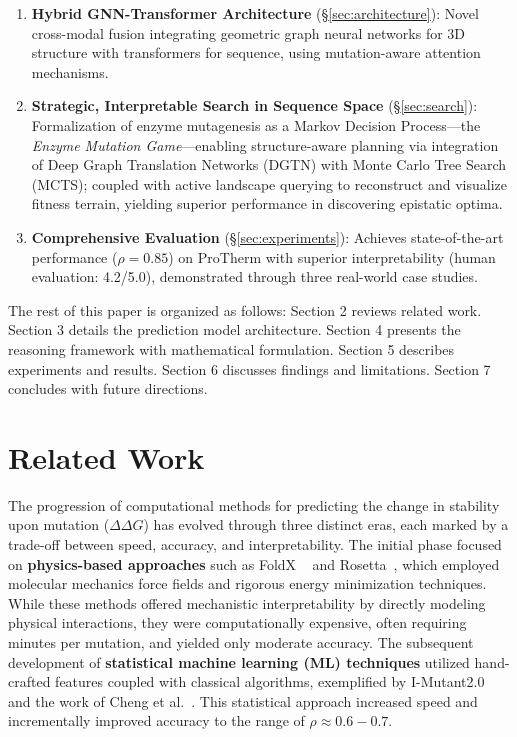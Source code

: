 \documentclass[11pt]{article}
\begin{document}
\begin{enumerate}
    \item \textbf{Hybrid GNN-Transformer Architecture}
        (\S\ref{sec:architecture}): Novel cross-modal fusion integrating
        geometric graph neural networks for 3D structure with transformers for
        sequence, using mutation-aware attention mechanisms.
    
\item \textbf{Strategic, Interpretable Search in Sequence Space}
    (\S\ref{sec:search}): Formalization of enzyme mutagenesis as a Markov
        Decision Process—the \textit{Enzyme Mutation Game}—enabling
        structure-aware planning via integration of Deep Graph Translation
        Networks (DGTN) with Monte Carlo Tree Search (MCTS); coupled with
        active landscape querying to reconstruct and visualize fitness terrain,
        yielding superior performance in discovering epistatic optima.
    
    \item \textbf{Comprehensive Evaluation} (\S\ref{sec:experiments}): Achieves
        state-of-the-art performance ($\rho = 0.85$) on ProTherm with superior
        interpretability (human evaluation: 4.2/5.0), demonstrated through
        three real-world case studies.  

\end{enumerate}


The rest of this paper is organized as follows: Section 2 reviews related work.
Section 3 details the prediction model architecture. Section 4 presents the
reasoning framework with mathematical formulation. Section 5 describes
experiments and results. Section 6 discusses findings and limitations. Section
7 concludes with future directions.

\section{Related Work}


The progression of computational methods for predicting the change in stability
upon mutation ($\Delta\Delta G$) has evolved through three distinct eras, each
marked by a trade-off between speed, accuracy, and interpretability. The
initial phase focused on \textbf{physics-based approaches} such as FoldX
~\cite{schymkowitz2005foldx} and Rosetta~\cite{kellogg2011role}, which
employed molecular mechanics force fields and rigorous energy minimization
techniques. While these methods offered mechanistic interpretability by
directly modeling physical interactions, they were computationally expensive,
often requiring minutes per mutation, and yielded only moderate accuracy. The
subsequent development of \textbf{statistical machine learning (ML) techniques}
utilized hand-crafted features coupled with classical algorithms, exemplified
by I-Mutant2.0~\cite{capriotti2005mutant} and the work of Cheng 
et al.~\cite{cheng2006prediction}. This statistical approach increased speed and
incrementally improved accuracy to the range of $\rho \approx 0.6-0.7$.
\end{document}
